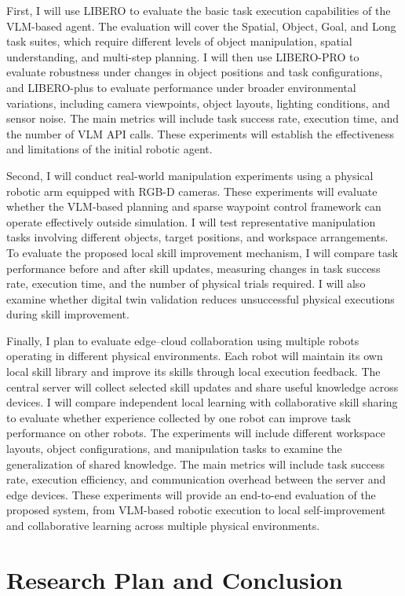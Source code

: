 \documentclass[11pt]{article}
\begin{document}
First, I will use LIBERO to evaluate the basic task execution capabilities of the VLM-based agent. The evaluation will cover the Spatial, Object, Goal, and Long task suites, which require different levels of object manipulation, spatial understanding, and multi-step planning. I will then use LIBERO-PRO to evaluate robustness under changes in object positions and task configurations, and LIBERO-plus to evaluate performance under broader environmental variations, including camera viewpoints, object layouts, lighting conditions, and sensor noise. The main metrics will include task success rate, execution time, and the number of VLM API calls. These experiments will establish the effectiveness and limitations of the initial robotic agent.

Second, I will conduct real-world manipulation experiments using a physical robotic arm equipped with RGB-D cameras. These experiments will evaluate whether the VLM-based planning and sparse waypoint control framework can operate effectively outside simulation. I will test representative manipulation tasks involving different objects, target positions, and workspace arrangements. To evaluate the proposed local skill improvement mechanism, I will compare task performance before and after skill updates, measuring changes in task success rate, execution time, and the number of physical trials required. I will also examine whether digital twin validation reduces unsuccessful physical executions during skill improvement.

Finally, I plan to evaluate edge--cloud collaboration using multiple robots operating in different physical environments. Each robot will maintain its own local skill library and improve its skills through local execution feedback. The central server will collect selected skill updates and share useful knowledge across devices. I will compare independent local learning with collaborative skill sharing to evaluate whether experience collected by one robot can improve task performance on other robots. The experiments will include different workspace layouts, object configurations, and manipulation tasks to examine the generalization of shared knowledge. The main metrics will include task success rate, execution efficiency, and communication overhead between the server and edge devices. These experiments will provide an end-to-end evaluation of the proposed system, from VLM-based robotic execution to local self-improvement and collaborative learning across multiple physical environments.


\section{Research Plan and Conclusion}
\label{sec:conclusion}
\end{document}

